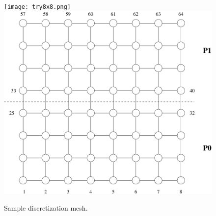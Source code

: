 \begin{figure}[h] 
\begin{center}
\ifcase\pdfoutput
\texttt{[image: try8x8.png]}
\or
\includegraphics[scale=0.45]{figures/try8x8}
\fi
\end{center}
\caption{Sample discretization mesh.\label{fig:try8x8}}
\end{figure}

